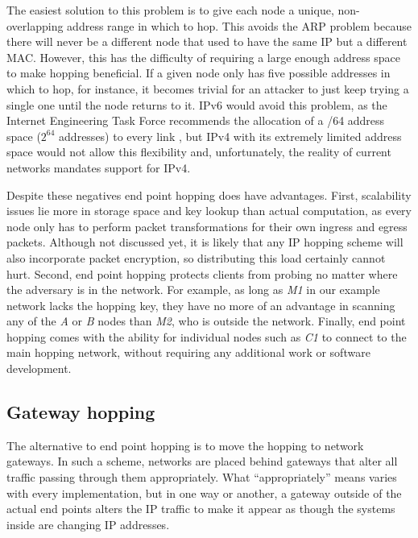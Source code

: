 \par The easiest solution to this problem is to give each node a unique, non-overlapping address range in which to hop. This avoids the ARP problem because there will never be a different node that used to have the same IP but a different MAC. However, this has the difficulty of requiring a large enough address space to make hopping beneficial. If a given node only has five possible addresses in which to hop, for instance, it becomes trivial for an attacker to just keep trying a single one until the node returns to it. IPv6 would avoid this problem, as the Internet Engineering Task Force recommends the allocation of a /64 address space ($2^{64}$ addresses) to every link \cite{rfc3267}, but IPv4 with its extremely limited address space would not allow this flexibility and, unfortunately, the reality of current networks mandates support for IPv4. 

\par Despite these negatives end point hopping does have advantages. First, scalability issues lie more in storage space and key lookup than actual computation, as every node only has to perform packet transformations for their own ingress and egress packets. Although not discussed yet, it is likely that any IP hopping scheme will also incorporate packet encryption, so distributing this load certainly cannot hurt. Second, end point hopping protects clients from probing no matter where the adversary is in the network. For example, as long as \textit{M1} in our example network lacks the hopping key, they have no more of an advantage in scanning any of the \textit{A} or \textit{B} nodes than \textit{M2}, who is outside the network. Finally, end point hopping comes with the ability for individual nodes such as \textit{C1} to connect to the main hopping network, without requiring any additional work or software development.

\subsection{Gateway hopping}
\par The alternative to end point hopping is to move the hopping to network gateways. In such a scheme, networks are placed behind gateways that alter all traffic passing through them appropriately. What ``appropriately'' means varies with every implementation, but in one way or another, a gateway outside of the actual end points alters the IP traffic to make it appear as though the systems inside are changing IP addresses.

